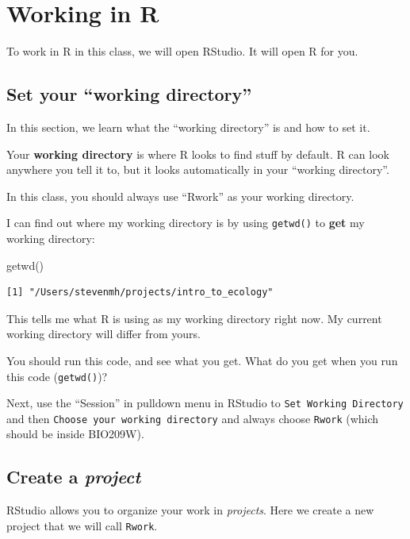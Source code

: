 \documentclass[
  letterpaper,
  DIV=11,
  numbers=noendperiod]{scrreprt}
\newenvironment{Shaded}{\begin{snugshade}}{\end{snugshade}}
\newcommand{\FunctionTok}[1]{\textcolor[rgb]{0.28,0.35,0.67}{#1}}
\newcommand{\NormalTok}[1]{\textcolor[rgb]{0.00,0.23,0.31}{#1}}
\begin{document}
\section{Working in R}\label{working-in-r}

To work in R in this class, we will open RStudio. It will open R for
you.

\subsection{Set your ``working
directory''}\label{set-your-working-directory}

In this section, we learn what the ``working directory'' is and how to
set it.

Your \textbf{working directory} is where R looks to find stuff by
default. R can look anywhere you tell it to, but it looks automatically
in your ``working directory''.

In this class, you should always use ``Rwork'' as your working
directory.

I can find out where my working directory is by using \texttt{getwd()}
to \textbf{get} my working directory:

\begin{Shaded}
\begin{Highlighting}[]
\FunctionTok{getwd}\NormalTok{()}
\end{Highlighting}
\end{Shaded}

\begin{verbatim}
[1] "/Users/stevenmh/projects/intro_to_ecology"
\end{verbatim}

This tells me what R is using as my working directory right now. My
current working directory will differ from yours.

You should run this code, and see what you get. What do you get when you
run this code (\texttt{getwd()})?

Next, use the ``Session'' in pulldown menu in RStudio to
\texttt{Set\ Working\ Directory} and then
\texttt{Choose\ your\ working\ directory} and always choose
\texttt{Rwork} (which should be inside BIO209W).

\subsection{\texorpdfstring{Create a
\emph{project}}{Create a project}}\label{create-a-project}

RStudio allows you to organize your work in \emph{projects}. Here we
create a new project that we will call \texttt{Rwork}.
\end{document}
